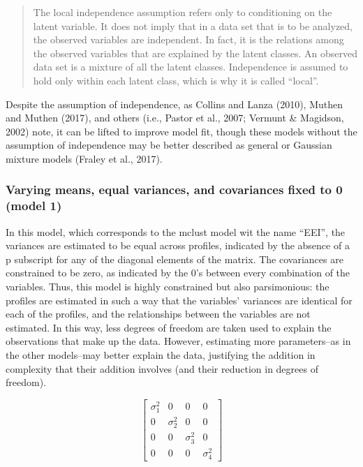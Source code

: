 \documentclass[]{book}
\theoremstyle{definition}
\theoremstyle{definition}
\theoremstyle{definition}
\theoremstyle{remark}
\begin{document}
\begin{quote}
The local independence assumption refers only to conditioning on the
latent variable. It does not imply that in a data set that is to be
analyzed, the observed variables are independent. In fact, it is the
relations among the observed variables that are explained by the latent
classes. An observed data set is a mixture of all the latent classes.
Independence is assumed to hold only within each latent class, which is
why it is called ``local''.
\end{quote}

Despite the assumption of independence, as Collins and Lanza (2010),
Muthen and Muthen (2017), and others (i.e., Pastor et al., 2007; Vermunt
\& Magidson, 2002) note, it can be lifted to improve model fit, though
these models without the assumption of independence may be better
described as general or Gaussian mixture models (Fraley et al., 2017).

\subsubsection{Varying means, equal variances, and covariances fixed to
0 (model
1)}\label{varying-means-equal-variances-and-covariances-fixed-to-0-model-1}

In this model, which corresponds to the mclust model wit the name
``EEI'', the variances are estimated to be equal across profiles,
indicated by the absence of a p subscript for any of the diagonal
elements of the matrix. The covariances are constrained to be zero, as
indicated by the 0's between every combination of the variables. Thus,
this model is highly constrained but also parsimonious: the profiles are
estimated in such a way that the variables' variances are identical for
each of the profiles, and the relationships between the variables are
not estimated. In this way, less degrees of freedom are taken used to
explain the observations that make up the data. However, estimating more
parameters--as in the other models--may better explain the data,
justifying the addition in complexity that their addition involves (and
their reduction in degrees of freedom).

\[
\left[ \begin{matrix} { \sigma  }_{ 1 }^{ 2 } & 0 & 0 & 0 \\ 0 & { \sigma  }_{ 2 }^{ 2 } & 0 & 0 \\ 0 & 0 & { \sigma  }_{ 3 }^{ 2 } & 0 \\ 0 & 0 & 0 & { \sigma  }_{ 4 }^{ 2 } \end{matrix} \right] 
\]
\end{document}
